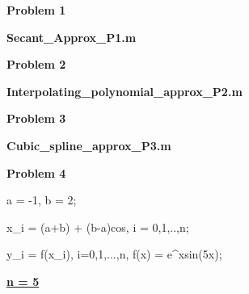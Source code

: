\documentclass[final,12pt,reqno]{amsart}
\begin{document}
\thispagestyle{fancy}

\textbf{Problem 1}

\textbf{Secant\_Approx\_P1.m}



\newpage

\textbf{Problem 2}

\textbf{Interpolating\_polynomial\_approx\_P2.m}



\newpage

\textbf{Problem 3}

\textbf{Cubic\_spline\_approx\_P3.m}



\newpage

\textbf{Problem 4}

\begin{itemize*}
	\item a = -1, b = 2;
	\item x_i = (a+b) + (b-a)cos, \quad i = 0,1,..,n;\\
	\item y_i = f(x_i), \quad i=0,1,...,n, \quad {} \quad f(x) = e^xsin(5x);
\end{itemize*}

\underline{\textbf{n = 5}}
\end{document}
